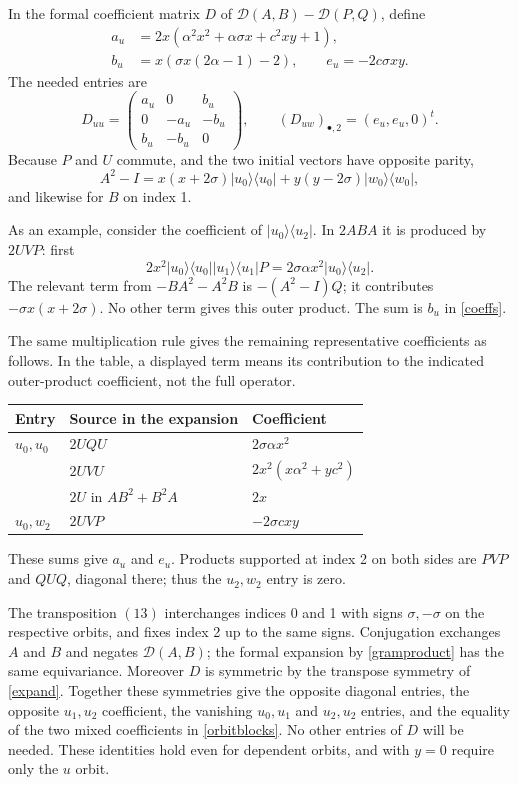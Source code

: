 \documentclass[11pt]{article}
\newcommand{\DD}{\mathcal D}
\newcommand{\pr}[1]{|#1\rangle\langle#1|}
\begin{document}
In the formal coefficient matrix $D$ of $\DD(A,B)-\DD(P,Q)$, define
\begin{equation}\label{coeffs}
 \begin{aligned}
 a_u&=2x(\alpha^2x^2+\alpha\sigma x+c^2xy+1),\\
 b_u&=x(\sigma x(2\alpha-1)-2),\qquad e_u=-2c\sigma xy.
 \end{aligned}
\end{equation}
The needed entries are
\begin{equation}\label{orbitblocks}
 D_{uu}=\begin{pmatrix}a_u&0&b_u\\0&-a_u&-b_u\\b_u&-b_u&0\end{pmatrix},\qquad
 (D_{uw})_{\bullet,2}=(e_u,e_u,0)^t.
\end{equation}
Because $P$ and $U$ commute, and the two initial vectors have opposite parity,
\[
 A^2-I=x(x+2\sigma)\pr{u_0}+y(y-2\sigma)\pr{w_0},
\]
and likewise for $B$ on index 1. 

As an example, consider the coefficient of $|u_0\rangle\langle u_2|$. In $2ABA$ it is produced by $2UVP$: first
\[
 2x^2\pr{u_0}\pr{u_1}P
   =2\sigma\alpha x^2|u_0\rangle\langle u_2|.
\]
The relevant term from $-BA^2-A^2B$ is $-(A^2-I)Q$; it contributes $-\sigma x(x+2\sigma)$. No other term gives this outer product. The sum is $b_u$ in \eqref{coeffs}.

The same multiplication rule gives the remaining representative coefficients as follows. In the table, a displayed term means its contribution to the indicated outer-product coefficient, not the full operator.
\begin{center}
\begin{tabular}{@{}lll@{}}
\toprule
Entry & Source in the expansion & Coefficient\\
\midrule
$u_0,u_0$ & $2UQU$ & $2\sigma\alpha x^2$\\
 & $2UVU$ & $2x^2(x\alpha^2+yc^2)$\\
 & $2U$ in $AB^2+B^2A$ & $2x$\\[2pt]
$u_0,w_2$ & $2UVP$ & $-2\sigma cxy$\\
\bottomrule
\end{tabular}
\end{center}
These sums give $a_u$ and $e_u$. Products supported at index 2 on both sides are $PVP$ and $QUQ$, diagonal there; thus the $u_2,w_2$ entry is zero.

The transposition $(13)$ interchanges indices 0 and 1 with signs $\sigma,-\sigma$ on the respective orbits, and fixes index 2 up to the same signs. Conjugation exchanges $A$ and $B$ and negates $\DD(A,B)$; the formal expansion by \eqref{gramproduct} has the same equivariance. Moreover $D$ is symmetric by the transpose symmetry of \eqref{expand}. Together these symmetries give the opposite diagonal entries, the opposite $u_1,u_2$ coefficient, the vanishing $u_0,u_1$ and $u_2,u_2$ entries, and the equality of the two mixed coefficients in \eqref{orbitblocks}. No other entries of $D$ will be needed. These identities hold even for dependent orbits, and with $y=0$ require only the $u$ orbit.
\end{document}
